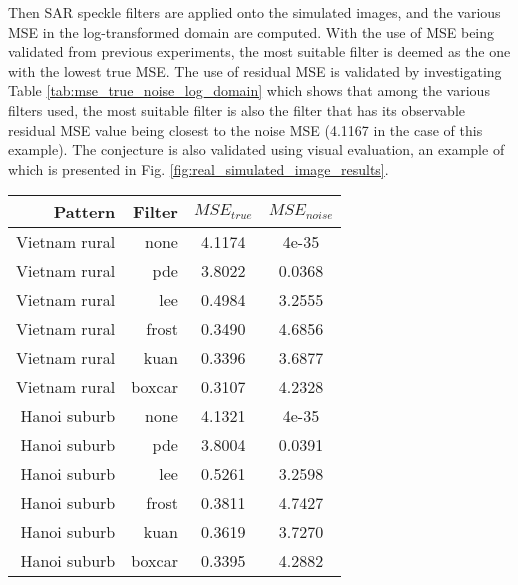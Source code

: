 Then SAR speckle filters are applied onto the simulated images, and the various MSE in the log-transformed domain are computed.
With the use of MSE being validated from previous experiments, 
	the most suitable filter is deemed as the one with the lowest true MSE.
The use of residual MSE is validated by investigating 
Table \ref{tab:mse_true_noise_log_domain} which shows that among the various filters used, 
	the most suitable filter is also the filter that 
		has its observable residual MSE value being closest to the noise MSE (4.1167 in the case of this example).
The conjecture is also validated using visual evaluation, an example of
	which is presented in Fig. \ref{fig:real_simulated_image_results}.

\begin{table}
\centering
\begin{tabular}{r|r|c|c}
Pattern  & Filter  & $MSE_{true}$   & $MSE_{noise}$      \\%
\hline
Vietnam rural	& none		& 4.1174	& 4e-35\\
Vietnam rural	& pde			& 3.8022	& 0.0368\\
Vietnam rural	& lee			& 0.4984	& 3.2555\\
Vietnam rural	& frost		& 0.3490	& 4.6856\\
Vietnam rural	& kuan		& 0.3396	& 3.6877\\
Vietnam rural	& boxcar	& 0.3107	& 4.2328\\
\hline
Hanoi suburb	& none		& 4.1321	& 4e-35\\
Hanoi suburb	& pde			& 3.8004	& 0.0391\\
Hanoi suburb	& lee			& 0.5261	& 3.2598\\
Hanoi suburb	& frost		& 0.3811	& 4.7427\\
Hanoi suburb	& kuan		& 0.3619	& 3.7270\\
Hanoi suburb	& boxcar	& 0.3395	& 4.2882\\
\hline
\end{tabular}


\end{table}
